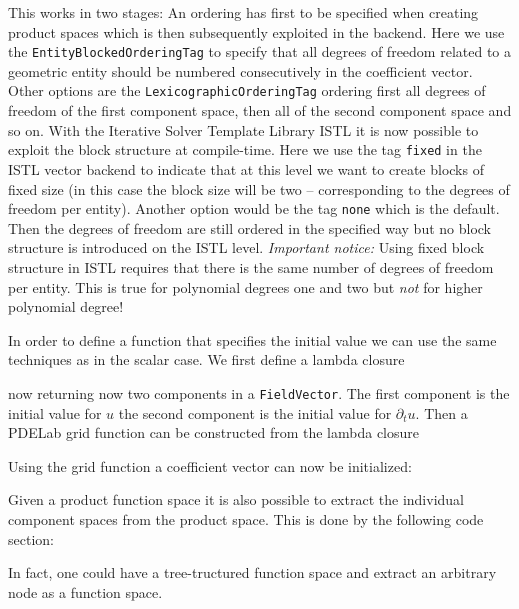 \documentclass[a4paper,12pt]{article}
\begin{document}
This works in two stages: An ordering has first to be specified when creating product spaces
which is then subsequently exploited in the backend.
Here we use the \lstinline{EntityBlockedOrderingTag} to specify that all degrees of 
freedom related to a geometric entity should be numbered consecutively in
the coefficient vector. Other options are the \lstinline{LexicographicOrderingTag}
ordering first all degrees of freedom of the first component space, then
all of the second component space and so on.
With the Iterative Solver Template Library ISTL it is now
possible to exploit the block structure at compile-time. 
Here we use the tag \lstinline{fixed} in the ISTL vector backend to indicate
that at this level we want to create blocks of fixed size (in this case the block size will be two --
corresponding to the degrees of freedom per entity). Another option
would be the tag \lstinline{none} which is the default. Then the degrees
of freedom are still ordered in the specified way but no block structure is
introduced on the ISTL level. \textit{Important notice:} Using fixed block
structure in ISTL requires that there is the same number of degrees of freedom
per entity. This is true for polynomial degrees one and two but \textit{not}
for higher polynomial degree! 

In order to define a function that specifies the initial value we can
use the same techniques as in the scalar case. We first define a lambda
closure

now returning now two components in a \lstinline{FieldVector}.
The first component is the initial value for $u$ the second component
is the initial value for $\partial_t u$. Then a PDELab grid function
can be constructed from the lambda closure


Using the grid function a coefficient vector can now be initialized:


Given a product function space it is also possible to
extract the individual component spaces from the product
space. This is done by the following code section:

In fact, one could have a tree-tructured function space and
extract an arbitrary node as a function space.
\end{document}
